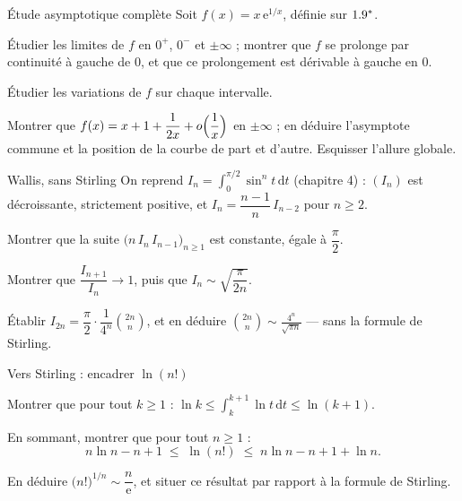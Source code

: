 \begin{exercice}[3]{Étude asymptotique complète}
Soit $f(x)=x\,\mathrm{e}^{1/x}$, définie sur $1.9^{*}$.
\begin{questions}
  \item Étudier les limites de $f$ en $0^{+}$, $0^{-}$ et $\pm\infty$ ;
    montrer que $f$ se prolonge par continuité à gauche de $0$, et que ce
    prolongement est dérivable à gauche en $0$.
  \item Étudier les variations de $f$ sur chaque intervalle.
  \item Montrer que $f(x)=x+1+\dfrac{1}{2x}+o\Bigl(\dfrac1x\Bigr)$ en
    $\pm\infty$ ; en déduire l'asymptote commune et la position de la
    courbe de part et d'autre. Esquisser l'allure globale.
\end{questions}
\end{exercice}

\begin{exercice}[3]{Wallis, sans Stirling}
On reprend $I_n=\displaystyle\int_{0}^{\pi/2}\sin^{n}t\,\mathrm{d}t$
(chapitre 4) : $(I_n)$ est décroissante, strictement positive, et
$I_n=\dfrac{n-1}{n}\,I_{n-2}$ pour $n\geqslant2$.
\begin{questions}
  \item Montrer que la suite $\bigl(n\,I_n\,I_{n-1}\bigr)_{n\geqslant1}$ est
    constante, égale à $\dfrac{\pi}{2}$.
  \item Montrer que $\dfrac{I_{n+1}}{I_n}\to1$, puis que
    $I_n\sim\sqrt{\dfrac{\pi}{2n}}$.
  \item Établir $I_{2n}=\dfrac{\pi}{2}\cdot\dfrac{1}{4^{n}}\binom{2n}{n}$,
    et en déduire $\displaystyle\binom{2n}{n}\sim\frac{4^{n}}{\sqrt{\pi n}}$
    — sans la formule de Stirling.
\end{questions}
\end{exercice}

\begin{exercice}[3]{Vers Stirling : encadrer $\ln(n!)$}
\begin{questions}
  \item Montrer que pour tout $k\geqslant1$ :
    $\ln k\leqslant\displaystyle\int_{k}^{k+1}\ln t\,\mathrm{d}t\leqslant\ln(k+1)$.
  \item En sommant, montrer que pour tout $n\geqslant1$ :
    \[
    n\ln n-n+1\;\leqslant\;\ln(n!)\;\leqslant\;n\ln n-n+1+\ln n.
    \]
  \item En déduire $\bigl(n!\bigr)^{1/n}\sim\dfrac{n}{\mathrm{e}}$, et situer ce
    résultat par rapport à la formule de Stirling.
\end{questions}
\end{exercice}


